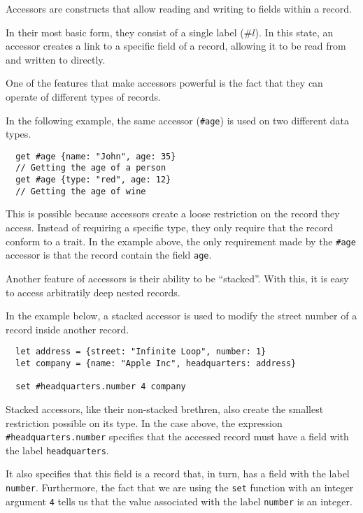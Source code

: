 \documentclass{article}
\begin{document}
Accessors are constructs that allow reading and writing to fields within a record.

In their most basic form, they consist of a single label ($\#l$).
In this state, an accessor creates a link to a specific field of a record, allowing it to be read from and written to directly.

One of the features that make accessors powerful is the fact that they can operate of different types of records.

In the following example, the same accessor (\texttt{\#age}) is used on two different data types.

\begin{lstlisting}
  get #age {name: "John", age: 35}
  // Getting the age of a person
  get #age {type: "red", age: 12}
  // Getting the age of wine
\end{lstlisting}

This is possible because accessors create a loose restriction on the record they access.
Instead of requiring a specific type, they only require that the record conform to a trait.
In the example above, the only requirement made by the \texttt{\#age} accessor is that the record contain the field \texttt{age}.

\medskip

Another feature of accessors is their ability to be ``stacked''.
With this, it is easy to access arbitratily deep nested records.

In the example below, a stacked accessor is used to modify the street number of a record inside another record.

\begin{lstlisting}
  let address = {street: "Infinite Loop", number: 1}
  let company = {name: "Apple Inc", headquarters: address}

  set #headquarters.number 4 company
\end{lstlisting}

Stacked accessors, like their non-stacked brethren, also create the smallest restriction possible on its type.
In the case above, the expression \texttt{\#headquarters.number} specifies that the accessed record must have a field with the label \texttt{headquarters}.

It also specifies that this field is a record that, in turn, has a field with the label \texttt{number}.
Furthermore, the fact that we are using the \texttt{set} function with an integer argument \texttt{4} tells us that the value associated with the label \texttt{number} is an integer.
\end{document}
